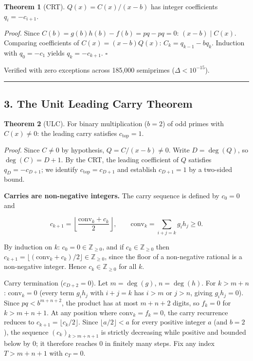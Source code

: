 \documentclass[
  11pt,
]{article}
\begin{document}
\textbf{Theorem 1} (CRT). \(Q(x) = C(x)/(x-b)\) has integer coefficients
\(q_i = -c_{i+1}\).

\emph{Proof.} Since \(C(b) = g(b)h(b) - f(b) = pq - pq = 0\):
\((x-b) \mid C(x)\). Comparing coefficients of \(C(x) = (x-b)Q(x)\):
\(C_k = q_{k-1} - bq_k\). Induction with \(q_0 = -c_1\) yields
\(q_k = -c_{k+1}\). \(\square\)

Verified with zero exceptions across 185,000 semiprimes (\(\Delta < 10^{-15}\)).

\begin{center}\rule{0.5\linewidth}{0.5pt}\end{center}

\newpage

\subsection{3. The Unit Leading Carry
Theorem}\label{the-unit-leading-carry-theorem}

\textbf{Theorem 2} (ULC). For binary multiplication (\(b = 2\)) of odd primes
with \(C(x) \neq 0\): the leading carry satisfies \(c_{\text{top}} = 1\).

\emph{Proof.} Since \(C \neq 0\) by hypothesis, \(Q = C/(x - b) \neq 0\). Write
\(D = \deg(Q)\), so \(\deg(C) = D + 1\). By the CRT, the leading coefficient of
\(Q\) satisfies \(q_D = -c_{D+1}\); we identify \(c_{\text{top}} = c_{D+1}\) and
establish \(c_{D+1} = 1\) by a two-sided bound.

\textbf{Carries are non-negative integers.} The carry sequence is defined by
\(c_0 = 0\) and

\[c_{k+1} = \left\lfloor \frac{\text{conv}_k + c_k}{2} \right\rfloor, \qquad \text{conv}_k = \sum_{i+j=k} g_i h_j \geq 0.\]

By induction on \(k\): \(c_0 = 0 \in \mathbb{Z}_{\geq 0}\), and if
\(c_k \in \mathbb{Z}_{\geq 0}\) then
\(c_{k+1} = \lfloor(\text{conv}_k + c_k)/2\rfloor \in \mathbb{Z}_{\geq 0}\),
since the floor of a non-negative rational is a non-negative integer. Hence
\(c_k \in \mathbb{Z}_{\geq 0}\) for all \(k\).

Carry termination (\(c_{D+2} = 0\)). Let \(m = \deg(g)\), \(n = \deg(h)\). For
\(k > m + n\): \(\text{conv}_k = 0\) (every term \(g_i h_j\) with \(i + j = k\)
has \(i > m\) or \(j > n\), giving \(g_i h_j = 0\)). Since \(pq < b^{m+n+2}\),
the product has at most \(m + n + 2\) digits, so \(f_k = 0\) for
\(k > m + n + 1\). At any position where \(\text{conv}_k = f_k = 0\), the carry
recurrence reduces to \(c_{k+1} = \lfloor c_k/2 \rfloor\). Since
\(\lfloor a/2 \rfloor < a\) for every positive integer \(a\) (and \(b = 2\)),
the sequence \((c_k)_{k > m+n+1}\) is strictly decreasing while positive and
bounded below by \(0\); it therefore reaches \(0\) in finitely many steps. Fix
any index \(T > m + n + 1\) with \(c_T = 0\).
\end{document}
